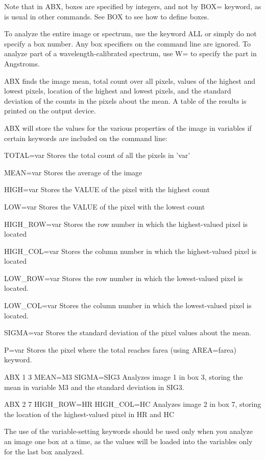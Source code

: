 Note that in ABX, boxes are specified by integers, and not by BOX= keyword,
as is usual in other commands.  See BOX to see how to define boxes.

To analyze the entire image or spectrum, use the keyword ALL or simply do
not specify a box number. Any box specifiers on the command line are
ignored.  To analyze part of a wavelength-calibrated spectrum, use W= to
specify the part in Angstroms.

ABX finds the image mean, total count over all pixels, values of the
highest and lowest pixels, location of the highest and lowest pixels, and
the standard deviation of the counts in the pixels about the mean. A table
of the results is printed on the output device.

ABX will store the values for the various properties of the image in
variables if certain keywords are included on the command line:
\begin{example}
  \item[TOTAL=var\hfill]{Stores the total count of all the pixels in 'var'}
  \item[MEAN=var\hfill]{Stores the average of the image}
  \item[HIGH=var\hfill]{Stores the VALUE of the pixel with the highest count}
  \item[LOW=var\hfill]{Stores the VALUE of the pixel with the lowest count}
  \item[HIGH\_ROW=var\hfill]{Stores the row number in which the highest-valued
       pixel is located}
  \item[HIGH\_COL=var\hfill]{Stores the column number in which the 
       highest-valued pixel is located}
  \item[LOW\_ROW=var\hfill]{Stores the row number in which the lowest-valued
       pixel is located.}
  \item[LOW\_COL=var\hfill]{Stores the column number in which the lowest-valued
       pixel is located.}
  \item[SIGMA=var\hfill]{Stores the standard deviation of the pixel values
       about the mean.}
  \item[P=var \hfill]{ Stores the pixel where the total reaches farea
       (using AREA=farea) keyword.}
\end{example}

\begin{example}
  \item[ABX 1 3 MEAN=M3 SIGMA=SIG3\hfill]{Analyzes image 1 in box 3, storing
       the mean in variable M3 and the standard deviation in SIG3.}
  \item[ABX 2 7 HIGH\_ROW=HR HIGH\_COL=HC\hfill]{ Analyzes image 2 in box 7, 
       storing the location of the highest-valued pixel in HR and HC}
\end{example}
The use of the variable-setting keywords should be used only when you
analyze an image one box at a time, as the values will be loaded into the
variables only for the last box analyzed.

